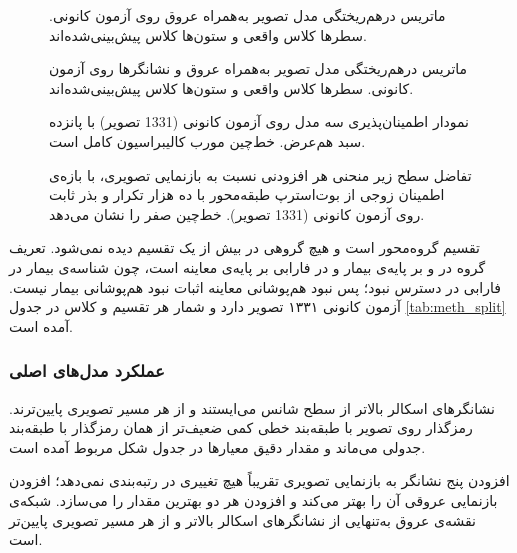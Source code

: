 \begin{figure}[htbp]
  \centering
  \caption{ماتریس درهم‌ریختگی مدل تصویر به‌همراه عروق روی آزمون کانونی. سطرها کلاس واقعی و ستون‌ها کلاس پیش‌بینی‌شده‌اند.}
  \label{fig:U40}
\end{figure}

\begin{figure}[htbp]
  \centering
  \caption{ماتریس درهم‌ریختگی مدل تصویر به‌همراه عروق و نشانگرها روی آزمون کانونی. سطرها کلاس واقعی و ستون‌ها کلاس پیش‌بینی‌شده‌اند.}
  \label{fig:U41}
\end{figure}

\begin{figure}[htbp]
  \centering
  \caption{نمودار اطمینان‌پذیری سه مدل روی آزمون کانونی (1331 تصویر) با پانزده سبد هم‌عرض. خط‌چین مورب کالیبراسیون کامل است.}
  \label{fig:U42}
\end{figure}

\begin{figure}[htbp]
  \centering
  \caption{تفاضل سطح زیر منحنی هر افزودنی نسبت به بازنمایی تصویری، با بازه‌ی اطمینان زوجی از بوت‌استرپ طبقه‌محور با ده هزار تکرار و بذر ثابت روی آزمون کانونی (1331 تصویر). خط‌چین صفر را نشان می‌دهد.}
  \label{fig:U43}
\end{figure}


تقسیم گروه‌محور است و هیچ گروهی در بیش از یک تقسیم دیده نمی‌شود. تعریف گروه در  و  بر پایه‌ی بیمار و در فارابی بر پایه‌ی معاینه است، چون شناسه‌ی بیمار در فارابی در دسترس نبود؛ پس نبود هم‌پوشانی معاینه اثبات نبود هم‌پوشانی بیمار نیست. آزمون کانونی ۱۳۳۱ تصویر دارد و شمار هر تقسیم و کلاس در جدول \ref{tab:meth_split} آمده است.



\subsubsection{عملکرد مدل‌های اصلی}

نشانگرهای اسکالر بالاتر از سطح شانس می‌ایستند و از هر مسیر تصویری پایین‌ترند. رمزگذار  روی تصویر  با طبقه‌بند خطی کمی ضعیف‌تر از همان رمزگذار با طبقه‌بند جدولی می‌ماند و مقدار دقیق معیارها در جدول شکل مربوط آمده است.

افزودن پنج نشانگر به بازنمایی تصویری تقریباً هیچ تغییری در رتبه‌بندی نمی‌دهد؛ افزودن بازنمایی عروقی آن را بهتر می‌کند و افزودن هر دو بهترین مقدار را می‌سازد. شبکه‌ی نقشه‌ی عروق به‌تنهایی از نشانگرهای اسکالر بالاتر و از هر مسیر تصویری پایین‌تر است.


